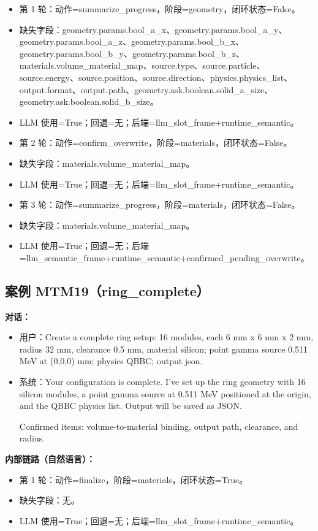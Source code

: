 \documentclass[11pt]{ctexart}
\begin{document}
\begin{itemize}
\item 第 1 轮：动作=summarize\_progress，阶段=geometry，闭环状态=False。
\item 缺失字段：geometry.params.bool\_a\_x、geometry.params.bool\_a\_y、geometry.params.bool\_a\_z、geometry.params.bool\_b\_x、geometry.params.bool\_b\_y、geometry.params.bool\_b\_z、materials.volume\_material\_map、source.type、source.particle、source.energy、source.position、source.direction、physics.physics\_list、output.format、output.path、geometry.ask.boolean.solid\_a\_size、geometry.ask.boolean.solid\_b\_size。
\item LLM 使用=True；回退=无；后端=llm\_slot\_frame+runtime\_semantic。
\item 第 2 轮：动作=confirm\_overwrite，阶段=materials，闭环状态=False。
\item 缺失字段：materials.volume\_material\_map。
\item LLM 使用=True；回退=无；后端=llm\_slot\_frame+runtime\_semantic。
\item 第 3 轮：动作=summarize\_progress，阶段=materials，闭环状态=False。
\item 缺失字段：materials.volume\_material\_map。
\item LLM 使用=True；回退=无；后端=llm\_semantic\_frame+runtime\_semantic+confirmed\_pending\_overwrite。
\end{itemize}
\subsection{案例 MTM19（ring\_complete）}
\textbf{对话：}
\begin{itemize}
\item 用户：Create a complete ring setup: 16 modules, each 6 mm x 6 mm x 2 mm, radius 32 mm, clearance 0.5 mm, material silicon; point gamma source 0.511 MeV at (0,0,0) mm; physics QBBC; output json.
\item 系统：Your configuration is complete. I've set up the ring geometry with 16 silicon modules, a point gamma source at 0.511 MeV positioned at the origin, and the QBBC physics list. Output will be saved as JSON.

Confirmed items: volume-to-material binding, output path, clearance, and radius.
\end{itemize}
\textbf{内部链路（自然语言）：}
\begin{itemize}
\item 第 1 轮：动作=finalize，阶段=materials，闭环状态=True。
\item 缺失字段：无。
\item LLM 使用=True；回退=无；后端=llm\_slot\_frame+runtime\_semantic。
\end{itemize}
\end{document}
